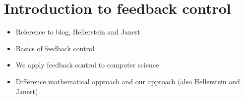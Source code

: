 \chapter{Introduction to feedback control}

\begin{itemize}
	\item Reference to blog, Hellerstein and Janert
	\item Basics of feedback control
	\item We apply feedback control to computer science
	\item Difference mathematical approach and our approach (also Hellerstein and Janert)
\end{itemize}